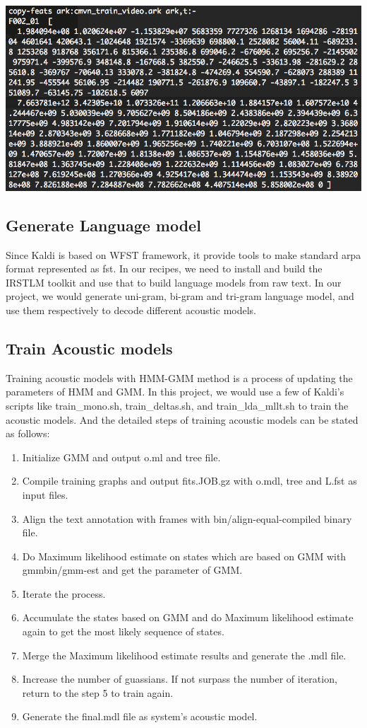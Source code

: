 \begin{center}
\includegraphics[width=1\linewidth]{images/cmvn_video.png}\\
\label{img:cmvnvideo}
\end{center}

\subsection{Generate Language model}
Since Kaldi is based on WFST framework, it provide tools to make standard arpa format represented as fst. In our recipes, we need to install and build the IRSTLM toolkit and use that to build language models from raw text.
In our project, we would generate uni-gram, bi-gram and tri-gram language model, and use them respectively to decode different acoustic models.
\subsection{ Train Acoustic models }
Training acoustic models with HMM-GMM method is a process of updating the parameters of HMM and GMM. In this project, we would use a few of Kaldi's scripts like train\_mono.sh, train\_deltas.sh, and train\_lda\_mllt.sh to train the acoustic models.
And the detailed steps of training acoustic models can be stated as follows:
\begin{enumerate}
\item Initialize GMM and output o.ml and tree file.
\item Compile training graphs and output fits.JOB.gz with o.mdl, tree and L.fst as input files.
\item Align the text annotation with frames with bin/align-equal-compiled binary file.
\item Do Maximum likelihood estimate on states which are based on GMM with gmmbin/gmm-est and get the parameter of GMM.
\item Iterate the process.
\item Accumulate the states based on GMM and do Maximum likelihood estimate  again to get the most likely sequence of states.
\item Merge the Maximum likelihood estimate results and generate the .mdl file.
\item Increase the number of guassians. If not surpass the number of iteration, return to the step 5 to train again.
\item Generate the final.mdl file as system's acoustic model.
\end{enumerate}

